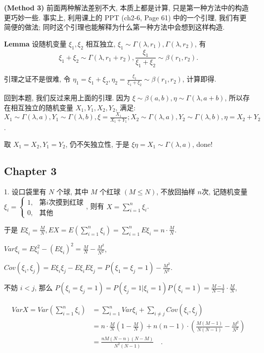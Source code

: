 \documentclass[UTF8]{ctexart}
\begin{document}
\textbf{(Method 3)} 前面两种解法差别不大, 本质上都是计算, 只是第一种方法中的构造更巧妙一些. 事实上, 利用课上的 PPT (ch2-6, Page 61) 中的一个引理, 我们有更简便的做法; 同时这个引理也能解释为什么第一种方法中会想到这样构造.

\textbf{Lemma} 设随机变量 $\xi_1,\xi_2$ 相互独立, $\xi_1\sim \Gamma(\lambda,r_1), \Gamma(\lambda,r_2)$, 有 
\[
\xi_1+\xi_2\sim\Gamma(\lambda,r_1+r_2), \frac{\xi_1}{\xi_1+\xi_2}\sim\beta(r_1,r_2).
\]

引理之证不是很难, 令 $\eta_1=\xi_1+\xi_2, \eta_2=\displaystyle \frac{\xi_1}{\xi_1+\xi_2}\sim\beta(r_1,r_2)$, 计算即得.

回到本题, 我们反过来用上面的引理. 因为 $\xi\sim\beta(a,b), \eta\sim\Gamma(\lambda,a+b)$, 所以存在相互独立的随机变量 $X_1,Y_1,X_2,Y_2$, 满足: $X_1\sim\Gamma(\lambda,a),Y_1\sim\Gamma(\lambda,b),\xi=\displaystyle\frac{X_1}{X_1+Y_1}; X_2\sim\Gamma(\lambda,a),Y_2\sim\Gamma(\lambda,b),\eta=X_2+Y_2$.

取 $X_1=X_2,Y_1=Y_2$, 仍不矢独立性, 于是 $\xi\eta=X_1\sim\Gamma(\lambda,a)$, done!

\subsection*{Chapter 3}
1. 设口袋里有 $N$ 个球, 其中 $M$ 个红球 $(M\leq N)$, 不放回抽样 $n$次, 记随机变量 $\xi_i=\begin{cases}
                                                               1, & \mbox{第} i \mbox{次摸到红球} \\
                                                               0, & \mbox{其他}
                                                             \end{cases}$, 则有 $\displaystyle X=\sum\limits_{i=1}^{n}\xi_i$.

于是 $\displaystyle E\xi_i=\frac{M}{N}, EX=E\left(\sum\limits_{i=1}^{n}\xi_i\right)=\sum\limits_{i=1}^{n}E\xi_i=n\cdot\frac{M}{N}$.

$\displaystyle Var\xi_i=E\xi_i^2-(E\xi_i)^2=\frac{M}{N}-\frac{M^2}{N^2}$,

$\displaystyle Cov(\xi_i,\xi_j)=E\xi_i\xi_j-E\xi_iE\xi_j=P(\xi_1=\xi_j=1)-\frac{M^2}{N^2}$.

不妨 $i<j$, 那么 $\displaystyle P(\xi_i=\xi_j=1)=P(\xi_j=1|\xi_i=1)P(\xi_i=1)=\frac{M-1}{N-1}\cdot\frac{M}{N}$,

\[
\begin{aligned}
\displaystyle VarX=Var\left(\sum\limits_{i=1}^{n}\xi_i\right)&=\sum\limits_{i=1}^{n}Var\xi_i+\sum\limits_{i\neq j}Cov(\xi_i,\xi_j)\\
&=n\cdot\frac{M}{N}\left(1-\frac{M}{N}\right)+n(n-1)\cdot\left(\frac{M(M-1)}{N(N-1)}-\frac{M^2}{N^2}\right)\\
&=\frac{nM(N-n)(N-M)}{N^2(N-1)}\quad.
\end{aligned}
\]
\end{document}
